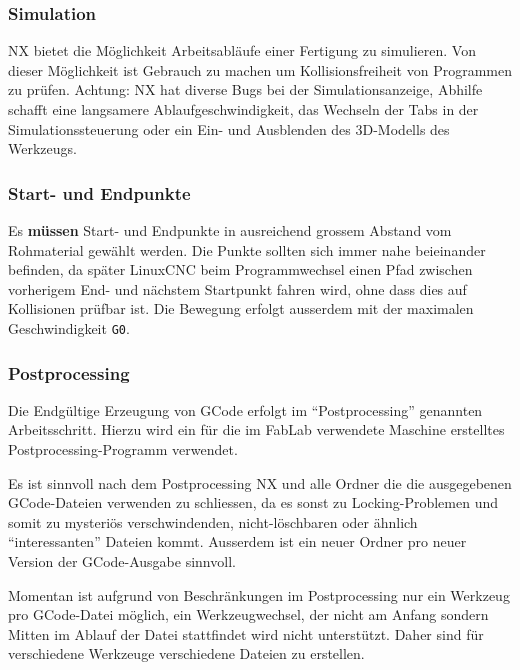 \documentclass{\basedir/fablab-document}
\begin{document}
\subsubsection{Simulation}

NX bietet die Möglichkeit Arbeitsabläufe einer Fertigung zu simulieren. Von dieser Möglichkeit ist Gebrauch zu machen um Kollisionsfreiheit von Programmen zu prüfen. Achtung: NX hat diverse Bugs bei der Simulationsanzeige, Abhilfe schafft eine langsamere Ablaufgeschwindigkeit, das Wechseln der Tabs in der Simulationssteuerung oder ein Ein- und Ausblenden des 3D-Modells des Werkzeugs.

\subsubsection{Start- und Endpunkte}


Es \textbf{müssen} Start- und Endpunkte in ausreichend grossem Abstand vom Rohmaterial gewählt werden. Die Punkte sollten sich immer nahe beieinander befinden, da später LinuxCNC beim Programmwechsel einen Pfad zwischen vorherigem End- und nächstem Startpunkt fahren wird, ohne dass dies auf Kollisionen prüfbar ist.
Die Bewegung erfolgt ausserdem mit der maximalen Geschwindigkeit \texttt{G0}.

\subsubsection{Postprocessing}

Die Endgültige Erzeugung von GCode erfolgt im "`Postprocessing"' genannten Arbeitsschritt. Hierzu wird ein für die im FabLab verwendete Maschine erstelltes Postprocessing-Programm verwendet. 

Es ist sinnvoll nach dem Postprocessing NX und alle Ordner die die ausgegebenen
GCode-Dateien verwenden zu schliessen, da es sonst zu Locking-Problemen und
somit zu mysteriös verschwindenden, nicht-löschbaren oder ähnlich
"`interessanten"' Dateien kommt. Ausserdem ist ein neuer Ordner pro neuer
Version der GCode-Ausgabe sinnvoll.

Momentan ist aufgrund von Beschränkungen im Postprocessing nur ein Werkzeug pro GCode-Datei möglich, ein Werkzeugwechsel, der nicht am Anfang sondern Mitten im Ablauf der Datei stattfindet wird nicht unterstützt. Daher sind für verschiedene Werkzeuge verschiedene Dateien zu erstellen.
\end{document}
